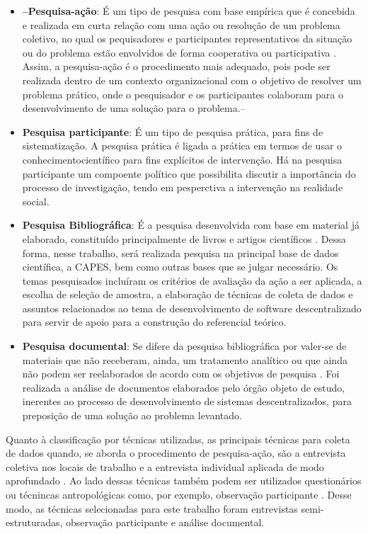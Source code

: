 \begin{itemize}
	\item \textbf{--Pesquisa-ação}: É um tipo de pesquisa com base empírica que é concebida e realizada em curta relação com uma ação ou resolução de um problema coletivo, no qual os pequisadores e participantes representativos da situação ou do problema estão envolvidos de forma cooperativa ou participativa \cite{thiollent2011metodologia}. Assim, a pesquisa-ação é o procedimento mais adequado, pois pode ser realizada dentro de um contexto organizacional com o objetivo de resolver um problema prático, onde o pesquisador e os participantes colaboram para o desenvolvimento de uma solução para o problema.--
	\item \textbf{Pesquisa participante}: É um tipo de pesquisa prática, para fins de sistematização. A pesquisa prática é ligada a prática em termos de usar o conhecimentocientífico para fins explícitos de intervenção. Há na pesquisa participante um compoente político que possibilita discutir a importância do processo de investigação, tendo em pesperctiva a intervenção na realidade social.
	\item \textbf{Pesquisa Bibliográfica}: É a pesquisa desenvolvida com base em
	material já elaborado, constituído principalmente de livros e artigos científicos \cite{gil2002}. Dessa forma, nesse trabalho, será realizada pesquisa na principal base de dados científica, a CAPES, bem como outras bases que se julgar necessário. Os temas pesquisados incluíram os critérios de avaliação da ação a ser aplicada, a escolha de seleção de amostra, a elaboração de técnicas de coleta de dados e assuntos relacionados ao tema de desenvolvimento de software descentralizado para servir de apoio para a construção do referencial teórico.
	\item \textbf{Pesquisa documental}: Se difere da pesquisa bibliográfica por valer-se de materiais que não receberam, ainda, um tratamento analítico ou que ainda não podem ser reelaborados de acordo com os objetivos de pesquisa \cite{gil2002}. Foi realizada a análise de documentos elaborados pelo órgão objeto de estudo, inerentes ao processo de desenvolvimento de sistemas descentralizados, para preposição de uma solução ao problema levantado.
\end{itemize}

Quanto à classificação por técnicas utilizadas, as principais técnicas para coleta de dados quando, se aborda o procedimento de pesquisa-ação, são a entrevista coletiva nos locais de trabalho e a entrevista individual aplicada de modo aprofundado \cite{thiollent2011metodologia}. Ao lado dessas técnicas também podem ser utilizados questionários ou técnincas antropológicas como, por exemplo, observação participante \cite{thiollent2011metodologia}. Desse modo, as técnicas selecionadas para este trabalho foram entrevistas semi-estruturadas, observação participante e análise documental.


